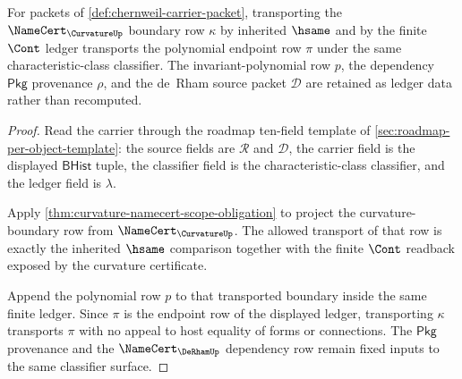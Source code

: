 \begin{theorem}
\label{thm:chernweil-curvature-polynomial-stability-obligation}
For packets of \autoref{def:chernweil-carrier-packet}, transporting the $\NameCert_{\CurvatureUp}$ boundary row $\kappa$ by inherited $\hsame$ and by the finite $\Cont$ ledger transports the polynomial endpoint row $\pi$ under the same characteristic-class classifier. The invariant-polynomial row $p$, the dependency $\mathsf{Pkg}$ provenance $\rho$, and the de~Rham source packet $\mathcal{D}$ are retained as ledger data rather than recomputed.
\end{theorem}
\begin{proof}
Read the carrier through the roadmap ten-field template of \autoref{sec:roadmap-per-object-template}: the source fields are $\mathcal{R}$ and $\mathcal{D}$, the carrier field is the displayed $\mathsf{BHist}$ tuple, the classifier field is the characteristic-class classifier, and the ledger field is $\lambda$.

Apply \autoref{thm:curvature-namecert-scope-obligation} to project the curvature-boundary row from $\NameCert_{\CurvatureUp}$. The allowed transport of that row is exactly the inherited $\hsame$ comparison together with the finite $\Cont$ readback exposed by the curvature certificate.

Append the polynomial row $p$ to that transported boundary inside the same finite ledger. Since $\pi$ is the endpoint row of the displayed ledger, transporting $\kappa$ transports $\pi$ with no appeal to host equality of forms or connections. The $\mathsf{Pkg}$ provenance and the $\NameCert_{\DeRhamUp}$ dependency row remain fixed inputs to the same classifier surface.
\end{proof}

